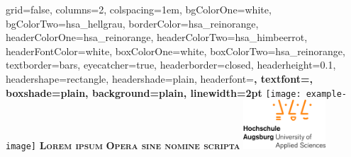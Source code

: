 \documentclass[portrait,final,a2paper,fontscale=0.55]{baposter}
\begin{document}



\begin{poster}%
  {
  grid=false,
  columns=2,
  colspacing=1em,
  bgColorOne=white,
  bgColorTwo=hsa_hellgrau,
  borderColor=hsa_reinorange,
  headerColorOne=hsa_reinorange,
  headerColorTwo=hsa_himbeerrot,
  headerFontColor=white,
  boxColorOne=white,
  boxColorTwo=hsa_reinorange,
  textborder=bars,
  eyecatcher=true,
  headerborder=closed,
  headerheight=0.1\textheight,
  headershape=rectangle,
  headershade=plain,
  headerfont=\Large\bf\sc, %
  textfont={\sf\setlength{\parindent}{1.5em}},
  boxshade=plain,
  background=plain,
  linewidth=2pt
  }
  {
	\texttt{[image: example-image]}
  } 
  {\bf\textsc{Lorem ipsum}\vspace{0.5em}}
  {\bf\textsc{Opera sine nomine scripta}\vspace{0.5em}}
  {%
    \includegraphics[height=5em]{images/hsa_logo_normal.jpg}
  }	


\end{poster}
\end{document}
